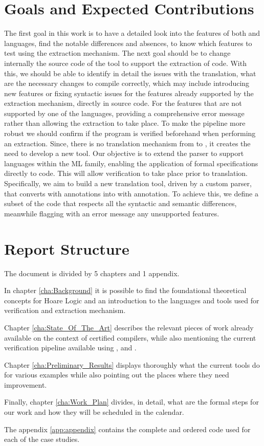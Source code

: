 \section{Goals and Expected Contributions}
\label{sec:Goals_and_Expected_Contributions}

The first goal in this work is to have a detailed look into the features of both \ocaml and \cml languages, find the notable 
differences and absences, to know which features to test using the extraction mechanism. The next goal should be to change 
internally the source code of the \cameleer tool to support the extraction of \cml code. With this, we should be able to identify
in detail the issues with the translation, what are the necessary changes to compile correctly, which may include introducing new features
or fixing syntactic issues for the features already supported by the extraction mechanism, directly in \whythree source code.
For the features that are not supported by one of the languages, providing a comprehensive error message rather than allowing 
the extraction to take place. To make the pipeline more robust we should confirm if the program is verified beforehand when performing 
an extraction. Since, there is no translation mechanism from \cml to \ocaml, it creates the need to develop a new tool. Our objective is 
to extend the \gospel parser to support languages within the ML family, enabling the application of formal specifications directly to 
\cml code. This will allow verification to take place prior to translation. Specifically, we aim to build a new translation tool, 
driven by a custom parser, that converts \cml with \gospel annotations into \ocaml with \gospel annotation. To achieve this, we define
a subset of the \cml code that respects all the syntactic and semantic differences, meanwhile flagging with an error message any 
unsupported features.

\section{Report Structure}
\label{sec:Report_Structure}

The document is divided by 5 chapters and 1 appendix. 

In chapter \ref{cha:Background} it is possible to find the foundational theoretical concepts for Hoare Logic and an introduction to 
the languages and tools used for verification and extraction mechanism.

Chapter \ref{cha:State_Of_The_Art} describes the relevant pieces of work already available on the context of certified compilers, 
while also mentioning the current verification pipeline available using \cameleer, \whythree and \cml. 

Chapter \ref{cha:Preliminary_Results} displays thoroughly what the current tools do for various examples while also pointing out the 
places where they need improvement. 

Finally, chapter \ref{cha:Work_Plan} divides, in detail, what are the formal steps for our work and how they will be scheduled in 
the calendar.

The appendix \ref{app:appendix} contains the complete and ordered code used for each of the case studies.